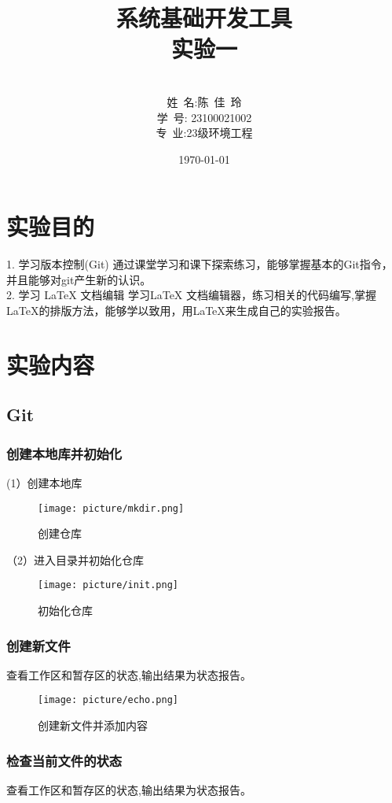 \documentclass[UTF8]{ctexart}
\title{{\Huge 系统基础开发工具{\large\linebreak\\}}{\Large 实验一\linebreak\linebreak}}
\author{\\姓\ 名:陈\ 佳\ 玲\\
学\ 号: 23100021002\\
专\ 业:23级环境工程\\
}
\date{\today}
\begin{document}
\fancyfoot[C]{\thepage}

\maketitle
\tableofcontents
\newpage

\section{实验目的}
 1. 学习版本控制(Git)
通过课堂学习和课下探索练习，能够掌握基本的Git指令，并且能够对git产生新的认识。
\\      
2. 学习 LaTeX 文档编辑
学习LaTeX 文档编辑器，练习相关的代码编写,掌握LaTeX的排版方法，能够学以致用，用LaTeX来生成自己的实验报告。


\section{实验内容}

\subsection{Git}

\subsubsection{创建本地库并初始化}
(1）创建本地库
\begin{figure}[H]
    \centering
    \texttt{[image: picture/mkdir.png]}
    \caption{创建仓库}
\end{figure}

（2）进入目录并初始化仓库
\begin{figure}[H]
    \centering
    \texttt{[image: picture/init.png]}
    \caption{初始化仓库}
\end{figure}

\subsubsection{创建新文件}
查看工作区和暂存区的状态,输出结果为状态报告。

\begin{figure}[H]
    \centering
    \texttt{[image: picture/echo.png]}
    \caption{创建新文件并添加内容}
\end{figure}

\subsubsection{检查当前文件的状态}
查看工作区和暂存区的状态,输出结果为状态报告。
\end{document}
